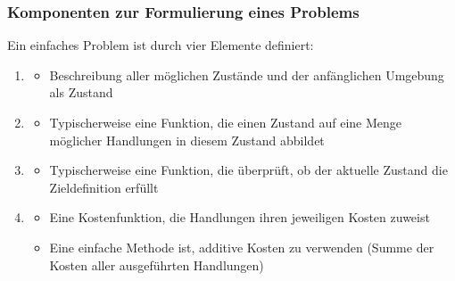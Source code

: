 \subsubsection*{Komponenten zur Formulierung eines Problems}
Ein einfaches Problem ist durch vier Elemente definiert:
\begin{enumerate}
    \item {}
    \begin{itemize}
        \item Beschreibung aller möglichen Zustände und der anfänglichen Umgebung als Zustand
    \end{itemize}
    \item {}
    \begin{itemize}
        \item Typischerweise eine Funktion, die einen Zustand auf eine Menge möglicher Handlungen in diesem Zustand abbildet
    \end{itemize}
    \item {}
    \begin{itemize}
        \item Typischerweise eine Funktion, die überprüft, ob der aktuelle Zustand die Zieldefinition erfüllt
    \end{itemize}
    \item {}
    \begin{itemize}
        \item Eine Kostenfunktion, die Handlungen ihren jeweiligen Kosten zuweist
        \item Eine einfache Methode ist, additive Kosten zu verwenden (Summe der Kosten aller ausgeführten Handlungen)
    \end{itemize}
\end{enumerate}
